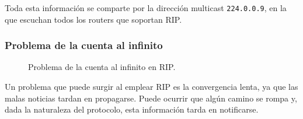 Toda esta información se comparte por la dirección multicast \verb|224.0.0.9|, en la que escuchan todos los routers que soportan \acrshort{RIP}.

\subsubsection{Problema de la cuenta al infinito}

\begin{figure}
    \centering
    \caption{Problema de la cuenta al infinito en \acrshort{RIP}.}
    \label{fig:rip}
\end{figure}

Un problema que puede surgir al emplear \acrshort{RIP} es la convergencia lenta, ya que las malas noticias tardan en propagarse. Puede ocurrir que algún camino se rompa y, dada la naturaleza del protocolo, esta información tarda en notificarse.

